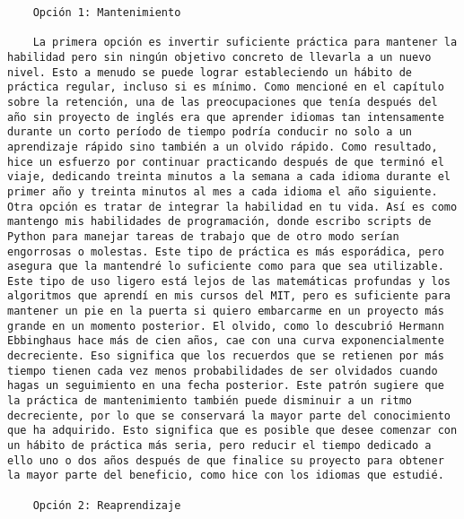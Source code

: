 \begin{verbatim}
	Opción 1: Mantenimiento
	
	La primera opción es invertir suficiente práctica para mantener la habilidad pero sin ningún objetivo concreto de llevarla a un nuevo nivel. Esto a menudo se puede lograr estableciendo un hábito de práctica regular, incluso si es mínimo. Como mencioné en el capítulo sobre la retención, una de las preocupaciones que tenía después del año sin proyecto de inglés era que aprender idiomas tan intensamente durante un corto período de tiempo podría conducir no solo a un aprendizaje rápido sino también a un olvido rápido. Como resultado, hice un esfuerzo por continuar practicando después de que terminó el viaje, dedicando treinta minutos a la semana a cada idioma durante el primer año y treinta minutos al mes a cada idioma el año siguiente. Otra opción es tratar de integrar la habilidad en tu vida. Así es como mantengo mis habilidades de programación, donde escribo scripts de Python para manejar tareas de trabajo que de otro modo serían engorrosas o molestas. Este tipo de práctica es más esporádica, pero asegura que la mantendré lo suficiente como para que sea utilizable. Este tipo de uso ligero está lejos de las matemáticas profundas y los algoritmos que aprendí en mis cursos del MIT, pero es suficiente para mantener un pie en la puerta si quiero embarcarme en un proyecto más grande en un momento posterior. El olvido, como lo descubrió Hermann Ebbinghaus hace más de cien años, cae con una curva exponencialmente decreciente. Eso significa que los recuerdos que se retienen por más tiempo tienen cada vez menos probabilidades de ser olvidados cuando hagas un seguimiento en una fecha posterior. Este patrón sugiere que la práctica de mantenimiento también puede disminuir a un ritmo decreciente, por lo que se conservará la mayor parte del conocimiento que ha adquirido. Esto significa que es posible que desee comenzar con un hábito de práctica más seria, pero reducir el tiempo dedicado a ello uno o dos años después de que finalice su proyecto para obtener la mayor parte del beneficio, como hice con los idiomas que estudié.
	
	Opción 2: Reaprendizaje
	

\end{verbatim}

